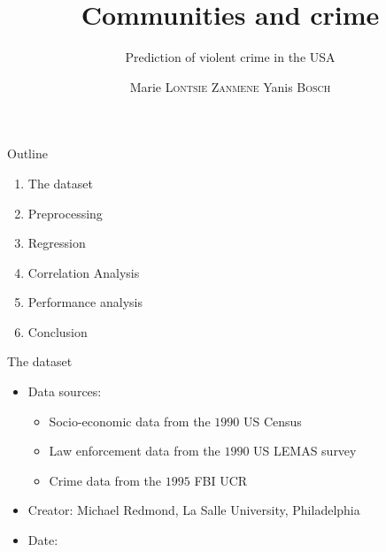 \documentclass{beamer}
\begin{document}
	\begin{frame}
		\title{Communities and crime}
		\subtitle{Prediction of violent crime in the USA}
		\author{Marie \textsc{Lontsie Zanmene} Yanis \textsc{Bosch}}
		\maketitle
	\end{frame}

	\begin{frame}{Outline}
		\begin{enumerate}
			\item The dataset
			\item Preprocessing
			\item Regression
			\item Correlation Analysis
			\item Performance analysis
			\item Conclusion
		\end{enumerate}
	\end{frame}

	\begin{frame}{The dataset}
		\begin{itemize}
			\item Data sources:
				\begin{itemize}
					\item Socio-economic data from the $1990$ US Census
					\item Law enforcement data from the $1990$ US LEMAS survey
					\item Crime data from the $1995$ FBI UCR
				\end{itemize}
			\item Creator: Michael Redmond, La Salle University, Philadelphia
			\item Date: \formatdate{13}{7}{2009}
		\end{itemize}
	\end{frame}
\end{document}
